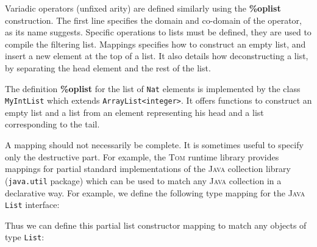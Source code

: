 \documentclass[runningheads]{llncs}
\newcommand{\tom}{\textsc{Tom}}
\newcommand{\java}{\textsc{Java}}
\newcommand{\lex}[1]{{\textrm{\textbf{#1}}}}
\begin{document}
Variadic operators (unfixed arity) are defined similarly using the
\lex{\%oplist} construction.  The first line specifies the domain and co-domain
of the operator, as its name suggests. Specific operations to lists must be
defined, they are used to compile the filtering list. Mappings specifies how to
construct an empty list, and insert a new element at the top of a list. It also
details how deconstructing a list, by separating the head element and the rest
of the list.


	
The definition \lex{\%oplist} for the list of \texttt{Nat} elements is
implemented by the class \texttt{MyIntList} which extends
\texttt{ArrayList<integer>}. It offers functions to construct an empty list and
a list from an element representing his head and a list corresponding to the
tail.

\medskip

A mapping should not necessarily be complete. It is sometimes useful to
specify only the destructive part. For example, the {\tom} runtime library
provides mappings for partial standard implementations of the {\java}
collection library (\texttt{java.util} package) which can be used to match any
{\java} collection in a declarative way. For example, we define the following
type mapping for the {\java} \verb+List+ interface:


Thus we can define this partial list constructor mapping to match any objects
of type \verb+List+:

\end{document}
